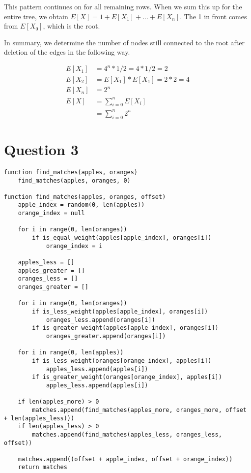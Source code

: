 \documentclass[11pt, oneside]{article}
\begin{document}
This pattern continues on for all remaining rows. When we sum this up for the entire tree, we obtain $E[X] = 1 + E[X_1] + ... + E[X_n]$. The 1 in front comes from $E[X_0]$, which is the root. \newline

In summary, we determine the number of nodes still connected to the root after deletion of the edges in the following way.

\begin{align*}
E[X_1] &= 4^n * 1/2 = 4 * 1/2 = 2 \\
E[X_2] &= E[X_1] * E[X_1] = 2 * 2 = 4 \\
E[X_n] &= 2^n \\
E[X] &= \sum_{i=0}^n E[X_i] \\
&= \sum_{i=0}^n 2^n
\end{align*}

\clearpage

\section{Question 3}

\begin{lstlisting}
function find_matches(apples, oranges)
    find_matches(apples, oranges, 0)

function find_matches(apples, oranges, offset)
    apple_index = random(0, len(apples))
    orange_index = null

    for i in range(0, len(oranges))
        if is_equal_weight(apples[apple_index], oranges[i])
            orange_index = i

    apples_less = []
    apples_greater = []
    oranges_less = []
    oranges_greater = []

    for i in range(0, len(oranges))
        if is_less_weight(apples[apple_index], oranges[i])
            oranges_less.append(oranges[i])
        if is_greater_weight(apples[apple_index], oranges[i])
            oranges_greater.append(oranges[i])

    for i in range(0, len(apples))
        if is_less_weight(oranges[orange_index], apples[i])
            apples_less.append(apples[i])
        if is_greater_weight(oranges[orange_index], apples[i])
            apples_less.append(apples[i])

    if len(apples_more) > 0
        matches.append(find_matches(apples_more, oranges_more, offset + len(apples_less)))
    if len(apples_less) > 0
        matches.append(find_matches(apples_less, oranges_less, offset))

    matches.append((offset + apple_index, offset + orange_index))
    return matches
\end{lstlisting}
\end{document}
